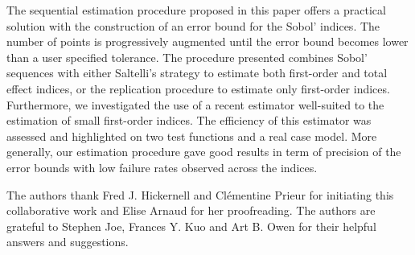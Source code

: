 The sequential estimation procedure proposed in this paper offers a practical solution with the construction of an error bound for the Sobol' indices. The number of points is progressively augmented until the error bound becomes lower than a user specified tolerance. The procedure presented combines Sobol' sequences with either Saltelli's strategy to estimate both first-order and total effect indices, or the replication procedure to estimate only first-order indices. Furthermore, we investigated the use of a recent estimator well-suited to the estimation of small first-order indices. The efficiency of this estimator was assessed and highlighted on two test functions and a real case model. More generally, our estimation procedure gave good results in term of precision of the error bounds with low failure rates observed across the indices. 

\begin{acknowledgements}
The authors thank Fred J. Hickernell and Cl\'ementine Prieur for initiating this collaborative work and Elise Arnaud for her proofreading. The authors are grateful to Stephen Joe, Frances Y. Kuo and Art B. Owen for their helpful answers and suggestions.   
\end{acknowledgements}


